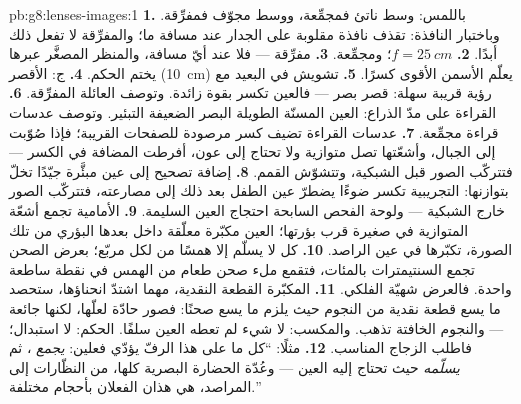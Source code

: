 \begin{solution}{pb:g8:lenses-images:1}
\textbf{1.} باللمس: وسط ناتئ فمجمِّعة، ووسط مجوّف فمفرِّقة.
وباختبار النافذة:  تقذف نافذة مقلوبة على
الجدار عند مسافة ما؛ والمفرِّقة لا تفعل ذلك أبدًا.
\textbf{2.} $f = \qty{25}{cm}$؛ ومجمِّعة.
\textbf{3.} مفرِّقة --- فلا  عند أيّ مسافة، والمنظر
المصغَّر عبرها يختم الحكم.
\textbf{4.} ج:  الأقصر (\qty{10}{cm}) يعلّم
 الأسمن الأقوى كسرًا.
\textbf{5.} تشويش في البعيد مع رؤية قريبة سهلة: قصر بصر ---
فالعين تكسر بقوة زائدة. وتوصف العائلة المفرِّقة.
\textbf{6.} القراءة على مدّ الذراع: العين المسنّة الطويلة
البصر الضعيفة التبئير. وتوصف عدسات قراءة مجمِّعة.
\textbf{7.} عدسات القراءة تضيف  كسر مرصودة للصفحات
القريبة؛ فإذا صُوّبت إلى الجبال، وأشعّتها تصل متوازية ولا
تحتاج إلى عون، أفرطت  المضافة في الكسر --- فتتركّب الصور
قبل الشبكية، وتتشوّش القمم.
\textbf{8.} إضافة تصحيح إلى عين مبئَّرة جيّدًا تخلّ بتوازنها:
 التجريبية تكسر ضوءًا يضطرّ عين الطفل بعد ذلك إلى
مصارعته، فتتركّب الصور خارج الشبكية --- ولوحة الفحص السابحة
احتجاج العين السليمة.
\textbf{9.}  الأمامية تجمع أشعّة  المتوازية في
 صغيرة قرب بؤرتها؛  العين مكبّرة معلّقة داخل
بعدها البؤري من تلك الصورة، تكبّرها في عين الراصد.
\textbf{10.} كل  لا يسلّم إلا همسًا من  لكل 
مربّع؛  بعرض الصحن تجمع السنتيمترات بالمئات، فتقمع ملء
صحن طعام من الهمس في نقطة ساطعة واحدة. فالعرض شهيّة الفلكي.
\textbf{11.} المكبّرة  القطعة النقدية، مهما اشتدّ
انحناؤها، ستحصد ما يسع قطعة نقدية من  النجوم حيث يلزم ما
يسع صحنًا: فصور حادّة لعلّها، لكنها جائعة --- والنجوم الخافتة
تذهب. والمكسب: لا شيء لم تعطه  العين سلفًا. الحكم: لا
استبدال؛ فاطلب الزجاج المناسب.
\textbf{12.} مثلًا: ``كل ما على هذا الرفّ يؤدّي فعلين:
\emph{يجمع} ، ثم \emph{يسلّمه} حيث تحتاج إليه العين ---
وعُدّة الحضارة البصرية كلها، من النظّارات إلى المراصد، هي
هذان الفعلان بأحجام مختلفة.''
\end{solution}
